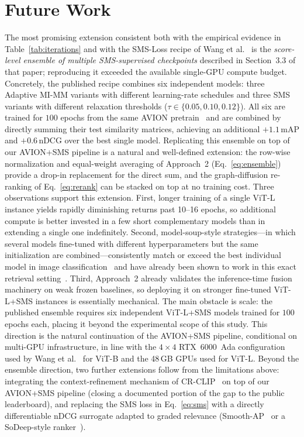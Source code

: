 \section{Future Work}
\label{sec:future}

The most promising extension consistent both with the empirical evidence in Table~\ref{tab:iterations} and with the SMS-Loss recipe of Wang et al.~\cite{wang2024symmetricmultisimilaritylossepickitchens100} is the \emph{score-level ensemble of multiple SMS-supervised checkpoints} described in Section~3.3 of that paper; reproducing it exceeded the available single-GPU compute budget. Concretely, the published recipe combines six independent models: three Adaptive MI-MM variants with different learning-rate schedules and three SMS variants with different relaxation thresholds ($\tau \in \{0.05, 0.10, 0.12\}$). All six are trained for $100$ epochs from the same AVION pretrain~\cite{zhao2023avion} and are combined by directly summing their test similarity matrices, achieving an additional $+1.1$\,mAP and $+0.6$\,nDCG over the best single model. Replicating this ensemble on top of our AVION+SMS pipeline is a natural and well-defined extension: the row-wise normalization and equal-weight averaging of Approach~2 (Eq.~\eqref{eq:ensemble}) provide a drop-in replacement for the direct sum, and the graph-diffusion re-ranking of Eq.~\eqref{eq:rerank} can be stacked on top at no training cost. Three observations support this extension. First, longer training of a single ViT-L instance yields rapidly diminishing returns past 10--16 epochs, so additional compute is better invested in a few short complementary models than in extending a single one indefinitely. Second, model-soup-style strategies---in which several models fine-tuned with different hyperparameters but the same initialization are combined---consistently match or exceed the best individual model in image classification~\cite{wortsman2022modelsoups} and have already been shown to work in this exact retrieval setting~\cite{wang2024symmetricmultisimilaritylossepickitchens100}. Third, Approach~2 already validates the inference-time fusion machinery on weak frozen baselines, so deploying it on stronger fine-tuned ViT-L+SMS instances is essentially mechanical. The main obstacle is scale: the published ensemble requires six independent ViT-L+SMS models trained for $100$ epochs each, placing it beyond the experimental scope of this study. This direction is the natural continuation of the AVION+SMS pipeline, conditional on multi-GPU infrastructure, in line with the $4\times 4$ RTX~6000~Ada configuration used by Wang et al.~\cite{wang2024symmetricmultisimilaritylossepickitchens100} for ViT-B and the 48\,GB GPUs used for ViT-L. Beyond the ensemble direction, two further extensions follow from the limitations above: integrating the context-refinement mechanism of CR-CLIP~\cite{he2025crclip} on top of our AVION+SMS pipeline (closing a documented portion of the gap to the public leaderboard), and replacing the SMS loss in Eq.~\eqref{eq:sms} with a directly differentiable nDCG surrogate adapted to graded relevance (Smooth-AP~\cite{brown2020smoothap} or a SoDeep-style ranker~\cite{engilberge2019sodeep}).
